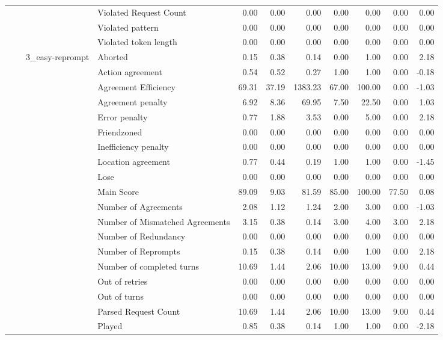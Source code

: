 \begin{tabular}{llllrrrrrrr}
 &  &  & Violated Request Count & 0.00 & 0.00 & 0.00 & 0.00 & 0.00 & 0.00 & 0.00 \\
 &  &  & Violated pattern & 0.00 & 0.00 & 0.00 & 0.00 & 0.00 & 0.00 & 0.00 \\
 &  &  & Violated token length & 0.00 & 0.00 & 0.00 & 0.00 & 0.00 & 0.00 & 0.00 \\
\cline{3-11}
 &  & \multirow[t]{27}{*}{3_easy-reprompt} & Aborted & 0.15 & 0.38 & 0.14 & 0.00 & 1.00 & 0.00 & 2.18 \\
 &  &  & Action agreement & 0.54 & 0.52 & 0.27 & 1.00 & 1.00 & 0.00 & -0.18 \\
 &  &  & Agreement Efficiency & 69.31 & 37.19 & 1383.23 & 67.00 & 100.00 & 0.00 & -1.03 \\
 &  &  & Agreement penalty & 6.92 & 8.36 & 69.95 & 7.50 & 22.50 & 0.00 & 1.03 \\
 &  &  & Error penalty & 0.77 & 1.88 & 3.53 & 0.00 & 5.00 & 0.00 & 2.18 \\
 &  &  & Friendzoned & 0.00 & 0.00 & 0.00 & 0.00 & 0.00 & 0.00 & 0.00 \\
 &  &  & Inefficiency penalty & 0.00 & 0.00 & 0.00 & 0.00 & 0.00 & 0.00 & 0.00 \\
 &  &  & Location agreement & 0.77 & 0.44 & 0.19 & 1.00 & 1.00 & 0.00 & -1.45 \\
 &  &  & Lose & 0.00 & 0.00 & 0.00 & 0.00 & 0.00 & 0.00 & 0.00 \\
 &  &  & Main Score & 89.09 & 9.03 & 81.59 & 85.00 & 100.00 & 77.50 & 0.08 \\
 &  &  & Number of Agreements & 2.08 & 1.12 & 1.24 & 2.00 & 3.00 & 0.00 & -1.03 \\
 &  &  & Number of Mismatched Agreements & 3.15 & 0.38 & 0.14 & 3.00 & 4.00 & 3.00 & 2.18 \\
 &  &  & Number of Redundancy & 0.00 & 0.00 & 0.00 & 0.00 & 0.00 & 0.00 & 0.00 \\
 &  &  & Number of Reprompts & 0.15 & 0.38 & 0.14 & 0.00 & 1.00 & 0.00 & 2.18 \\
 &  &  & Number of completed turns & 10.69 & 1.44 & 2.06 & 10.00 & 13.00 & 9.00 & 0.44 \\
 &  &  & Out of retries & 0.00 & 0.00 & 0.00 & 0.00 & 0.00 & 0.00 & 0.00 \\
 &  &  & Out of turns & 0.00 & 0.00 & 0.00 & 0.00 & 0.00 & 0.00 & 0.00 \\
 &  &  & Parsed Request Count & 10.69 & 1.44 & 2.06 & 10.00 & 13.00 & 9.00 & 0.44 \\
 &  &  & Played & 0.85 & 0.38 & 0.14 & 1.00 & 1.00 & 0.00 & -2.18 \\

\end{tabular}

